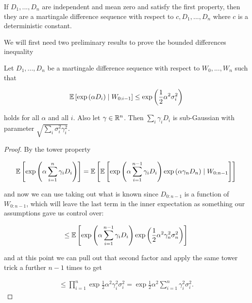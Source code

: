 \documentclass[11pt]{scrartcl}
\begin{document}
\begin{example}
If $D_1, ... , D_n$ are independent and mean zero and satisfy the first property, then they are a martingale difference sequence with respect to $c, D_1, ... , D_n$ where $c$ is a deterministic constant.
\end{example}

We will first need two preliminary results to prove the bounded differences inequality


\begin{theorem}
Let $D_1, ... , D_n$ be a martingale difference sequence with respect to $W_0, ... , W_n$ such that 

\begin{equation}
    \mathbb{E} \left[ \text{exp} \left( \alpha D_i \right) \mid W_{0:i-1} \right] \le \text{exp} \left( \frac12 \alpha^2 \sigma_i^2 \right)
\end{equation}

holds for all $\alpha$ and all $i$. Also let $\gamma \in \mathbb R^n$. Then $\sum_i \gamma_i D_i$ is sub-Gaussian with parameter $\sqrt{\sum_i \sigma_i^2 \gamma_i^2}$.

\begin{proof}
By the tower property 

\begin{equation}
    \mathbb{E} \left[ \text{exp} \left( \alpha \sum_{i=1}^n \gamma_i D_i \right) \right] = \mathbb{E} \left[ \mathbb{E} \left[ \text{exp} \left( \alpha \sum_{i=1}^{n-1} \gamma_i D_i \right)\text{exp} \left( \alpha \gamma_n D_n \right) \mid W_{0:n-1} \right] \right]
\end{equation}

and now we can use taking out what is known since $D_{0:n-1}$ is a function of $W_{0:n-1}$, which will leave the last term in the inner expectation as something our assumptions gave us control over:

\begin{align}
    \le \mathbb{E} \left[  \text{exp} \left( \alpha \sum_{i=1}^{n-1} \gamma_i D_i \right) \text{exp} \left(  \frac12 \alpha^2 \gamma_n^2 \sigma_n^2 \right) \right]
\end{align}

and at this point we can pull out that second factor and apply the same tower trick a further $n-1$ times to get

\begin{align}
    \le \prod_{i=1}^n \exp{\frac12 \alpha^2 \gamma_i^2 \sigma_i^2} = \exp{\frac12 \alpha^2 \sum_{i=1}^n \gamma_i^2 \sigma_i^2}.
\end{align}
\end{proof}
\label{L5: linear combo martingale}
\end{theorem}
\end{document}

